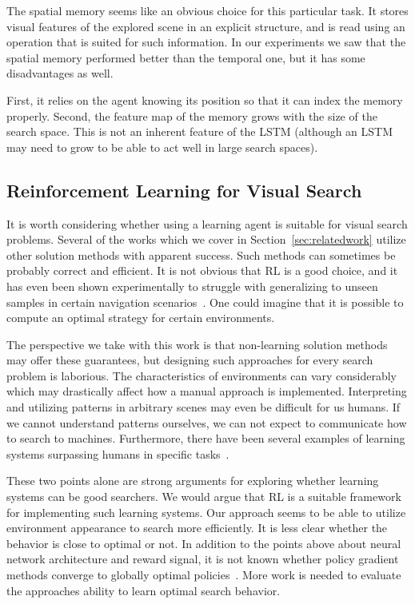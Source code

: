 The spatial memory seems like an obvious choice for this particular task.
It stores visual features of the explored scene in an explicit structure, and is read using an operation that is suited for such information.
In our experiments we saw that the spatial memory performed better than the temporal one,
but it has some disadvantages as well.

First, it relies on the agent knowing its position so that it can index the memory properly.
Second, the feature map of the memory grows with the size of the search space.
This is not an inherent feature of the LSTM (although an LSTM may need to grow to be able to act well in large search spaces).


\subsection{Reinforcement Learning for Visual Search}

It is worth considering whether using a learning agent is suitable for visual search problems.
Several of the works which we cover in Section~\ref{sec:relatedwork} utilize other solution methods with apparent success.
Such methods can sometimes be probably correct and efficient.
It is not obvious that RL is a good choice, and it has even been shown experimentally to struggle with generalizing to unseen samples in certain navigation scenarios~\cite{dhiman_critical_2019}.
One could imagine that it is possible to compute an optimal strategy for certain environments.

The perspective we take with this work is that non-learning solution methods may offer these guarantees, but designing such approaches for every search problem is laborious.
The characteristics of environments can vary considerably which may drastically affect how a manual approach is implemented.
Interpreting and utilizing patterns in arbitrary scenes may even be difficult for us humans.
If we cannot understand patterns ourselves, we can not expect to communicate how to search to machines.
Furthermore, there have been several examples of learning systems surpassing humans in specific tasks~\cite{silver_mastering_2016,vinyals_grandmaster_2019}.

These two points alone are strong arguments for exploring whether learning systems can be good searchers.
We would argue that RL is a suitable framework for implementing such learning systems.
Our approach seems to be able to utilize environment appearance to search more efficiently.
It is less clear whether the behavior is close to optimal or not.
In addition to the points above about neural network architecture and reward signal, it is not known whether policy gradient methods converge to globally optimal policies~\cite{agarwal_optimality_2020}.
More work is needed to evaluate the approaches ability to learn optimal search behavior.


